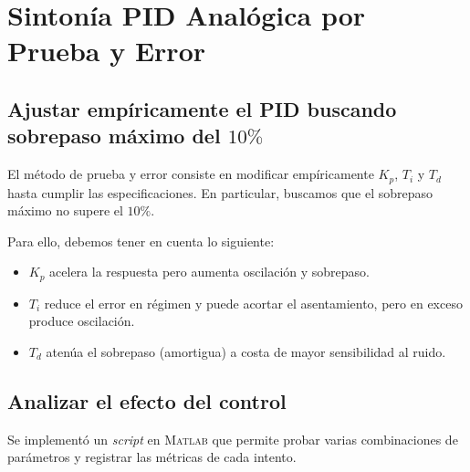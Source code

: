 \section{Sintonía PID Analógica por Prueba y Error}

\subsection{Ajustar empíricamente el PID buscando sobrepaso máximo del \texorpdfstring{$10\%$}{10\%}}

El método de prueba y error consiste en modificar empíricamente $K_p$, $T_i$ y $T_d$ hasta cumplir las especificaciones.  
En particular, buscamos que el sobrepaso máximo no supere el $10\%$.

Para ello, debemos tener en cuenta lo siguiente:
\begin{itemize}
	\item $K_p$ acelera la respuesta pero aumenta oscilación y sobrepaso.
	\item $T_i$ reduce el error en régimen y puede acortar el asentamiento, pero en exceso produce oscilación.
	\item $T_d$ atenúa el sobrepaso (amortigua) a costa de mayor sensibilidad al ruido.
\end{itemize}

\subsection{Analizar el efecto del control}

Se implementó un \textit{script} en \textsc{Matlab} que permite probar varias combinaciones de parámetros y registrar las métricas de cada intento.
\onecolumn %

